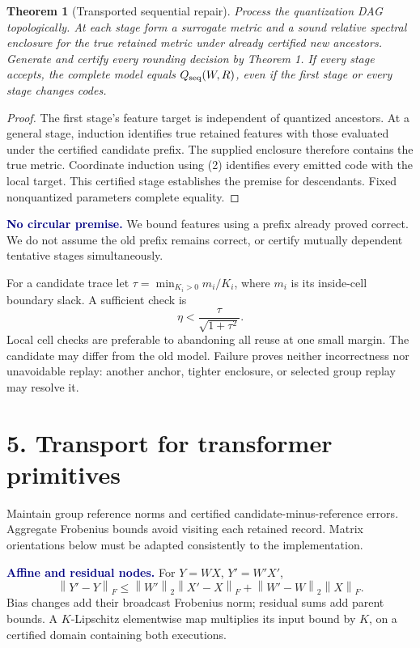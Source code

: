 \documentclass[11pt]{article}
\newtheorem{theorem}{Theorem}\newtheorem{lemma}{Lemma}\newtheorem{corollary}{Corollary}
\newcommand{\norm}[1]{\left\|#1\right\|}\newcommand{\tr}{\operatorname{tr}}
\newcommand{\note}[1]{\textcolor{navy}{\textbf{#1}}}
\begin{document}
\begin{theorem}[Transported sequential repair]
Process the quantization DAG topologically. At each stage form a surrogate metric and a sound relative spectral enclosure for the true retained metric under already certified new ancestors. Generate and certify every rounding decision by Theorem 1. If every stage accepts, the complete model equals $Q_{\rm seq}(W,R)$, even if the first stage or every stage changes codes.
\end{theorem}
\begin{proof}
The first stage's feature target is independent of quantized ancestors. At a general stage, induction identifies true retained features with those evaluated under the certified candidate prefix. The supplied enclosure therefore contains the true metric. Coordinate induction using (2) identifies every emitted code with the local target. This certified stage establishes the premise for descendants. Fixed nonquantized parameters complete equality.
\end{proof}

\note{No circular premise.} We bound features using a prefix already proved correct. We do not assume the old prefix remains correct, or certify mutually dependent tentative stages simultaneously.

For a candidate trace let $\tau=\min_{K_i>0}m_i/K_i$, where $m_i$ is its inside-cell boundary slack. A sufficient check is
\[
 \eta<\frac\tau{\sqrt{1+\tau^2}}. \tag{6}
\]
Local cell checks are preferable to abandoning all reuse at one small margin. The candidate may differ from the old model. Failure proves neither incorrectness nor unavoidable replay: another anchor, tighter enclosure, or selected group replay may resolve it.

\newpage
\section*{5. Transport for transformer primitives}
Maintain group reference norms and certified candidate-minus-reference errors. Aggregate Frobenius bounds avoid visiting each retained record. Matrix orientations below must be adapted consistently to the implementation.

\note{Affine and residual nodes.} For $Y=WX$, $Y'=W'X'$,
\[
 \norm{Y'-Y}_F\leq\norm{W'}_2\norm{X'-X}_F+
 \norm{W'-W}_2\norm X_F.
\]
Bias changes add their broadcast Frobenius norm; residual sums add parent bounds. A $K$-Lipschitz elementwise map multiplies its input bound by $K$, on a certified domain containing both executions.
\end{document}
